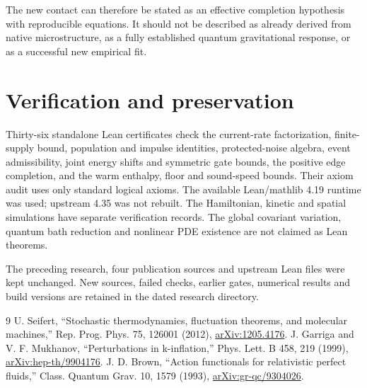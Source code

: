 \documentclass[11pt]{article}
\begin{document}
The new contact can therefore be stated as an effective completion
hypothesis with reproducible equations. It should not be described as
already derived from native microstructure, as a fully established
quantum gravitational response, or as a successful new empirical fit.

\section{Verification and preservation}
Thirty-six standalone Lean certificates check the current-rate
factorization, finite-supply bound, population and impulse identities,
protected-noise algebra, event admissibility, joint energy shifts and
symmetric gate bounds, the positive edge completion, and the warm
enthalpy, floor and sound-speed bounds. Their axiom audit
uses only standard logical axioms.
The available Lean/mathlib 4.19 runtime was used; upstream 4.35 was not rebuilt.
The Hamiltonian, kinetic and spatial simulations have separate verification
records. The global covariant variation, quantum bath reduction and
nonlinear PDE existence are not claimed as Lean theorems.

The preceding research, four publication sources and upstream Lean files
were kept unchanged. New sources, failed checks, earlier gates, numerical
results and build versions are retained in the dated research directory.

\begin{thebibliography}{9}
 U. Seifert, ``Stochastic thermodynamics, fluctuation theorems,
and molecular machines,'' Rep. Prog. Phys. 75, 126001 (2012),
\href{https://arxiv.org/abs/1205.4176}{arXiv:1205.4176}.
 J. Garriga and V. F. Mukhanov, ``Perturbations in k-inflation,''
Phys. Lett. B 458, 219 (1999),
\href{https://arxiv.org/abs/hep-th/9904176}{arXiv:hep-th/9904176}.
 J. D. Brown, ``Action functionals for relativistic perfect
fluids,'' Class. Quantum Grav. 10, 1579 (1993),
\href{https://arxiv.org/abs/gr-qc/9304026}{arXiv:gr-qc/9304026}.
\end{thebibliography}
\end{document}
